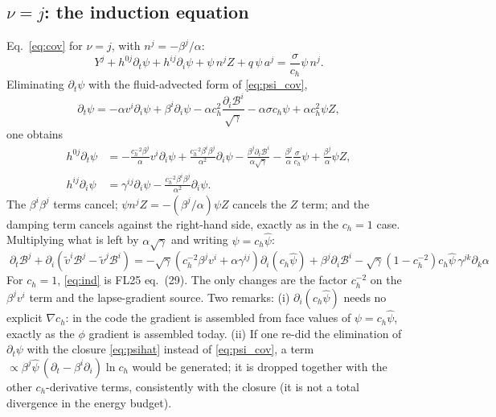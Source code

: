 \documentclass[11pt,a4paper]{article}
\newcommand{\cB}{\mathcal{B}}
\newcommand{\ph}{\hat\psi}
\newcommand{\ch}{c_h}
\newcommand{\pd}{\partial}
\newcommand{\sg}{\sqrt{\gamma}}
\begin{document}
\subsection{$\nu=j$: the induction equation}
Eq.~\eqref{eq:cov} for $\nu=j$, with $n^j=-\beta^j/\alpha$:
\begin{equation}
Y^j+h^{0j}\pd_t\psi+h^{ij}\pd_i\psi+\psi\,n^jZ+q\,\psi\,a^j=\frac{\sigma}{\ch}\psi\,n^j .
\end{equation}
Eliminating $\pd_t\psi$ with the fluid-advected form of \eqref{eq:psi_cov},
\begin{equation}
\pd_t\psi=-\alpha v^i\pd_i\psi+\beta^i\pd_i\psi-\alpha\ch^2\frac{\pd_i\cB^i}{\sg}-\alpha\sigma\ch\psi+\alpha\ch^2\psi Z,
\end{equation}
one obtains
\begin{align}
h^{0j}\pd_t\psi&=-\frac{\ch^{-2}\beta^j}{\alpha}v^i\pd_i\psi+\frac{\ch^{-2}\beta^i\beta^j}{\alpha^2}\pd_i\psi
-\frac{\beta^j\pd_i\cB^i}{\alpha\sg}-\frac{\beta^j}{\alpha}\frac{\sigma}{\ch}\psi+\frac{\beta^j}{\alpha}\psi Z,\\
h^{ij}\pd_i\psi&=\gamma^{ij}\pd_i\psi-\frac{\ch^{-2}\beta^i\beta^j}{\alpha^2}\pd_i\psi .
\end{align}
The $\beta^i\beta^j$ terms cancel; $\psi n^jZ=-(\beta^j/\alpha)\psi Z$ cancels the $Z$ term; and the damping term cancels against the right-hand side, exactly as in the $\ch=1$ case. Multiplying what is left by $\alpha\sg$ and writing $\psi=\ch\ph$:
\begin{equation}
\boxed{\;
\pd_t\cB^j+\pd_i\!\left(\tilde v^i\cB^j-\tilde v^j\cB^i\right)
=-\sg\left(\ch^{-2}\beta^jv^i+\alpha\gamma^{ij}\right)\pd_i(\ch\ph)+\beta^j\pd_i\cB^i
-\sg\left(1-\ch^{-2}\right)\ch\ph\,\gamma^{jk}\pd_k\alpha\;}
\label{eq:ind}
\end{equation}
For $\ch=1$, \eqref{eq:ind} is FL25 eq.~(29). The only changes are the factor $\ch^{-2}$ on the $\beta^jv^i$ term and the lapse-gradient source. Two remarks:
(i) $\pd_i(\ch\ph)$ needs no explicit $\nabla\ch$: in the code the gradient is assembled from face values of $\psi=\ch\ph$, exactly as the $\phi$ gradient is assembled today.
(ii) If one re-did the elimination of $\pd_t\psi$ with the closure \eqref{eq:psihat} instead of \eqref{eq:psi_cov}, a term $\propto\beta^j\ph\,(\pd_t-\beta^i\pd_i)\ln\ch$ would be generated; it is dropped together with the other $\ch$-derivative terms, consistently with the closure (it is not a total divergence in the energy budget).
\end{document}
